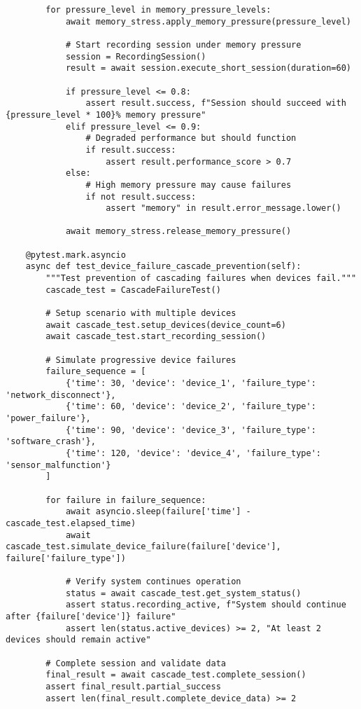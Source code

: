 \documentclass[12pt,a4paper]{report}
\begin{document}
\begin{verbatim}
        for pressure_level in memory_pressure_levels:
            await memory_stress.apply_memory_pressure(pressure_level)

            # Start recording session under memory pressure
            session = RecordingSession()
            result = await session.execute_short_session(duration=60)

            if pressure_level <= 0.8:
                assert result.success, f"Session should succeed with {pressure_level * 100}% memory pressure"
            elif pressure_level <= 0.9:
                # Degraded performance but should function
                if result.success:
                    assert result.performance_score > 0.7
            else:
                # High memory pressure may cause failures
                if not result.success:
                    assert "memory" in result.error_message.lower()

            await memory_stress.release_memory_pressure()

    @pytest.mark.asyncio
    async def test_device_failure_cascade_prevention(self):
        """Test prevention of cascading failures when devices fail."""
        cascade_test = CascadeFailureTest()

        # Setup scenario with multiple devices
        await cascade_test.setup_devices(device_count=6)
        await cascade_test.start_recording_session()

        # Simulate progressive device failures
        failure_sequence = [
            {'time': 30, 'device': 'device_1', 'failure_type': 'network_disconnect'},
            {'time': 60, 'device': 'device_2', 'failure_type': 'power_failure'},
            {'time': 90, 'device': 'device_3', 'failure_type': 'software_crash'},
            {'time': 120, 'device': 'device_4', 'failure_type': 'sensor_malfunction'}
        ]

        for failure in failure_sequence:
            await asyncio.sleep(failure['time'] - cascade_test.elapsed_time)
            await cascade_test.simulate_device_failure(failure['device'], failure['failure_type'])

            # Verify system continues operation
            status = await cascade_test.get_system_status()
            assert status.recording_active, f"System should continue after {failure['device']} failure"
            assert len(status.active_devices) >= 2, "At least 2 devices should remain active"

        # Complete session and validate data
        final_result = await cascade_test.complete_session()
        assert final_result.partial_success
        assert len(final_result.complete_device_data) >= 2
\end{verbatim}
\end{document}
